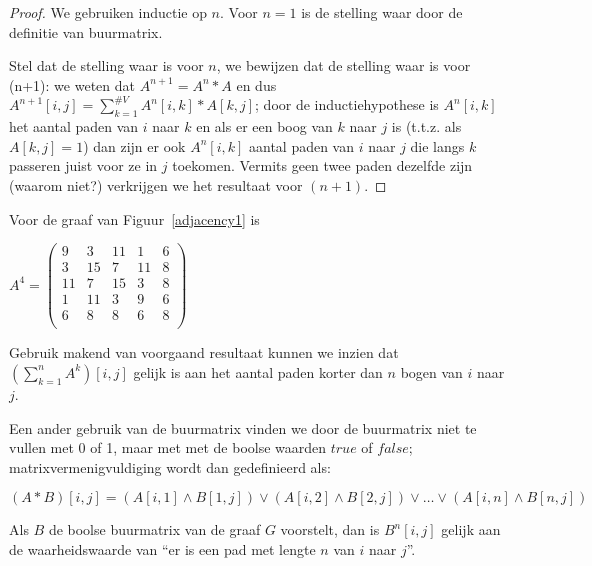 \begin{proof} We gebruiken inductie op $n$. Voor $n=1$ is de
stelling waar door de definitie van buurmatrix.

Stel dat de stelling waar is voor $n$, we bewijzen dat de stelling waar
is voor (n+1): we weten dat $A^{n+1}=A^{n}*A$ en dus $A^{n+1}[i,j] =
\sum_{k=1}^{\#V} A^{n}[i,k]*A[k,j]$; door de inductiehypothese is
$A^{n}[i,k]$ het aantal paden van $i$ naar $k$ en als er een boog van $k$
naar $j$ is (t.t.z. als $A[k,j] = 1$) dan zijn er ook $A^{n}[i,k]$
aantal paden van $i$ naar $j$ die langs $k$ passeren juist voor ze in $j$
toekomen. Vermits geen twee paden dezelfde zijn (waarom niet?)
verkrijgen we het resultaat voor $(n+1)$.
\end{proof}

Voor de graaf van Figuur~\ref{adjacency1} is
\begin{center}
$A^{4} = \left(
\begin{array}{ccccc}
9 & 3 & 11& 1 & 6\\
3 & 15& 7 & 11& 8\\
11& 7 & 15& 3 & 8\\
1 & 11& 3 & 9 & 6\\
6 & 8 & 8 & 6 & 8\\
\end{array}
\right)
$
\end{center}

Gebruik makend van voorgaand resultaat kunnen we inzien dat
$(\sum_{k=1}^{n} A^{k})[i,j]$ gelijk is aan het aantal paden korter
dan $n$ bogen van $i$ naar $j$.

Een ander gebruik van de buurmatrix vinden we door de buurmatrix niet
te vullen met 0 of 1, maar met met de boolse waarden $true$ of $false$;
matrixvermenigvuldiging wordt dan gedefinieerd als:

\[(A*B)[i,j] = (A[i,1] \wedge B[1,j]) \vee (A[i,2] \wedge B[2,j]) \vee
\ldots \vee (A[i,n] \wedge B[n,j])\]


Als $B$ de boolse buurmatrix van de graaf $G$ voorstelt, dan is
$B^{n}[i,j]$ gelijk aan de waarheidswaarde van ``er is een pad met
lengte $n$ van $i$ naar $j$''.

